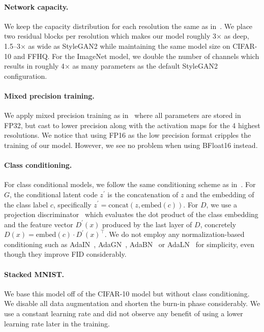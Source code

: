 \vspace{-0.1cm}
\paragraph{Network capacity.}
We keep the capacity distribution for each resolution the same as in~\cite{sg2ada,sg3}. We place two residual blocks per resolution which makes our model roughly 3$\times$ as deep, 1.5--3$\times$ as wide as StyleGAN2 while maintaining the same model size on CIFAR-10 and FFHQ. For the ImageNet model, we double the number of channels which results in roughly 4$\times$ as many parameters as the default StyleGAN2 configuration.

\vspace{-0.1cm}
\paragraph{Mixed precision training.}
We apply mixed precision training as in~\cite{sg2ada,sg3} where all parameters are stored in FP32, but cast to lower precision along with the activation maps for the 4 highest resolutions. We notice that using FP16 as the low precision format cripples the training of our model. However, we see no problem when using BFloat16 instead.

\vspace{-0.1cm}
\paragraph{Class conditioning.}
For class conditional models, we follow the same conditioning scheme as in~\cite{sg2ada}. For $G$, the conditional latent code $z^\prime$ is the concatenation of $z$ and the embedding of the class label $c$, specifically $z^\prime=\text{concat}(z,\text{embed}(c))$. For $D$, we use a projection discriminator~\cite{cgans} which evaluates the dot product of the class embedding and the feature vector $D^\prime(x)$ produced by the last layer of $D$, concretely $D(x)=\text{embed}(c)\cdot D^\prime(x)^\top$. We do not employ any normalization-based conditioning such as AdaIN~\cite{sg1}, AdaGN~\cite{adm,edm}, AdaBN~\cite{biggan} or AdaLN~\cite{dit} for simplicity, even though they improve FID considerably.

\vspace{-0.1cm}
\paragraph{Stacked MNIST.}
We base this model off of the CIFAR-10 model but without class conditioning. We disable all data augmentation and shorten the burn-in phase considerably. We use a constant learning rate and did not observe any benefit of using a lower learning rate later in the training.

